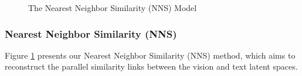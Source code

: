 \documentclass[11pt,a4paper]{article}
\newcommand\gal[1]{\textcolor{bright}{\textbf{GAL:} #1 }}
\newcommand\yuval[1]{\textcolor{darkpink}{\textbf{YUVAL:} #1 }}
\begin{document}

%
%






\begin{figure}[t]
\centering
{}
 \caption{The Nearest Neighbor Similarity (NNS) Model}
\label{fig:DS}
\end{figure}

\subsubsection{Nearest Neighbor Similarity (NNS)}

Figure \ref{fig:DS} presents our Nearest Neighbor Similarity (NNS) method, which aims to reconstruct the parallel similarity links between the vision and text latent spaces. 
\end{document}

